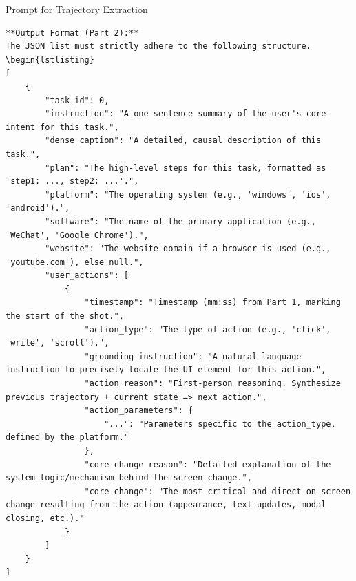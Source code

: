 \documentclass{llmxive}
\begin{document}
\begin{promptbox}{Prompt for Trajectory Extraction}
\begin{lstlisting}
**Output Format (Part 2):**
The JSON list must strictly adhere to the following structure.
\begin{lstlisting}
[
    {
        "task_id": 0,
        "instruction": "A one-sentence summary of the user's core intent for this task.",
        "dense_caption": "A detailed, causal description of this task.",
        "plan": "The high-level steps for this task, formatted as 'step1: ..., step2: ...'.",
        "platform": "The operating system (e.g., 'windows', 'ios', 'android').",
        "software": "The name of the primary application (e.g., 'WeChat', 'Google Chrome').",
        "website": "The website domain if a browser is used (e.g., 'youtube.com'), else null.",
        "user_actions": [
            {
                "timestamp": "Timestamp (mm:ss) from Part 1, marking the start of the shot.",
                "action_type": "The type of action (e.g., 'click', 'write', 'scroll').",
                "grounding_instruction": "A natural language instruction to precisely locate the UI element for this action.",
                "action_reason": "First-person reasoning. Synthesize previous trajectory + current state => next action.",
                "action_parameters": {
                    "...": "Parameters specific to the action_type, defined by the platform."
                },
                "core_change_reason": "Detailed explanation of the system logic/mechanism behind the screen change.",
                "core_change": "The most critical and direct on-screen change resulting from the action (appearance, text updates, modal closing, etc.)."
            }
        ]
    }
]
\end{lstlisting}


\end{promptbox}
\end{document}
